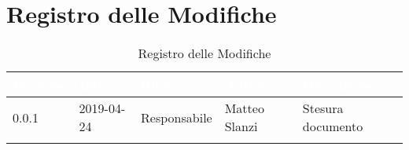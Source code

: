 \newpage

\section*{Registro delle Modifiche}

\begin{center}
\begin{longtable}[c]{|m{}|m{}|m{}|m{}|p{}|}
\hline
\rowcolor{bluelogo}\textbf{\textcolor{white}{Versione}} & \textbf{\textcolor{white}{Data}} & \textbf{\textcolor{white}{Ruolo}} & \textbf{\textcolor{white}{Autore}} & \textbf{\textcolor{white}{Descrizione}}\\
\hline \hline
\endfirsthead
0.0.1 & 2019-04-24 & Responsabile & Matteo Slanzi & Stesura documento \\
\hline
\caption{Registro delle Modifiche}
\end{longtable}
\end{center}
